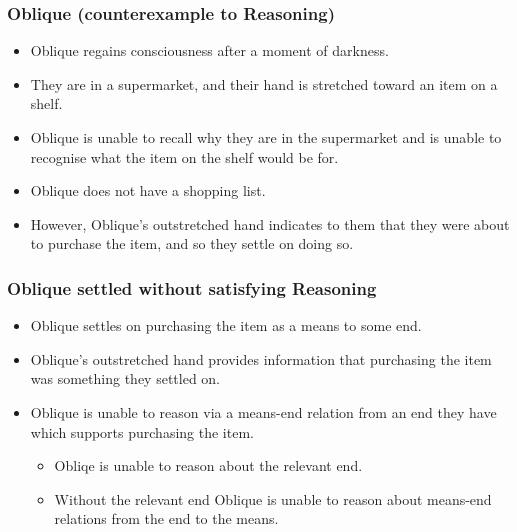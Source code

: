\documentclass[noamssymb,
graphics,
]{beamer} %
\newcommand{\hand}{\ding{43}}
\newcommand{\schemaName}[1]{\textsf{#1}}
\begin{document}
\begin{frame}
  \frametitle{Oblique (counterexample to \schemaName{Reasoning})}

  {\rmfamily
    \begin{itemize}
      \item Oblique regains consciousness after a moment of darkness.%
      \item They are in a supermarket, and their hand is stretched toward an item on a shelf.%
      \item Oblique is unable to recall why they are in the supermarket and is unable to recognise what the item on the shelf would be for.%
      \item Oblique does not have a shopping list.%
      \item However, Oblique's outstretched hand indicates to them that they were about to purchase the item, and so they settle on doing so.
      \end{itemize}
  }
\end{frame}

\begin{frame}
  \frametitle{Oblique settled without satisfying \schemaName{Reasoning}}

  \begin{itemize}
  \item Oblique settles on purchasing the item as a means to some end.
  \item Oblique's outstretched hand provides information that purchasing the item was something they settled on.
  \item[\hand] Oblique is unable to reason via a means-end relation from an end they have which supports purchasing the item.
    \begin{itemize}
    \item Obliqe is unable to reason about the relevant end.
    \item Without the relevant end Oblique is unable to reason about means-end relations from the end to the means.
    \end{itemize}
  \end{itemize}

\end{frame}
\end{document}
